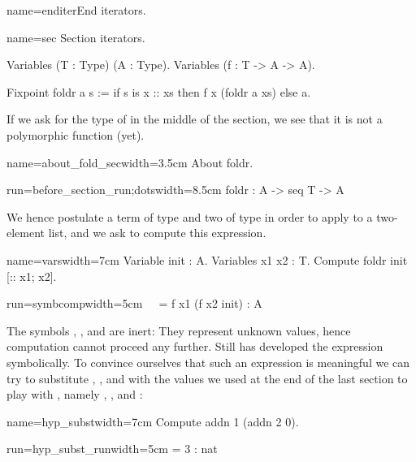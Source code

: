 \begin{coqdef}{name=enditer}End iterators.\end{coqdef}

\begin{coq}{name=sec}{}
Section iterators.

Variables (T : Type) (A : Type).
Variables (f : T -> A -> A).

Fixpoint foldr a s :=
  if s is x :: xs then f x (foldr a xs) else a.
\end{coq}

If we ask for the type of
 in the middle of the section, we see that
it is not a polymorphic function (yet).

\begin{coq-left}{name=about_fold_sec}{width=3.5cm}
About foldr.
\end{coq-left}
\begin{coqout-right}{run=before_section_run;dots}{width=8.5cm}
foldr : A -> seq T -> A
\end{coqout-right}

We hence postulate a term of type  and two of type 
in order to apply  to a two-element list,
and we ask \Coq{} to compute this
expression.

\begin{coq-left}{name=vars}{width=7cm}
Variable init : A.
Variables x1 x2 : T.
Compute foldr init [:: x1; x2].
\end{coq-left}
\begin{coqout-right}{run=symbcomp}{width=5cm}
$~$
$~$
 = f x1 (f x2 init) : A
\end{coqout-right}

The symbols , ,  and  are inert:
They represent unknown values, hence computation cannot
proceed any further.  Still
\Coq{} has developed the expression symbolically.
To convince
ourselves that such an expression is meaningful
we can try to substitute , ,  and  with the
values we used at the end of the last section to
play with , namely , ,  and :

\begin{coq-left}{name=hyp_subst}{width=7cm}
Compute addn 1 (addn 2 0).
\end{coq-left}
\begin{coqout-right}{run=hyp_subst_run}{width=5cm}
 = 3 : nat
\end{coqout-right}

